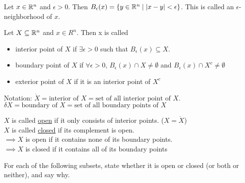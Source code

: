 

\begin{defn}
  Let $x\in \mathbb{R}^n$ and $\epsilon > 0$. Then $B_\epsilon (x) = \left\{ y\in \mathbb{R}^n \mid |x-y|<\epsilon \right\}$. This is called an $\epsilon$-neighborhood of $x$.
\end{defn}
\begin{defn}
  Let $X\subseteq \mathbb{R}^n$ and $x\in R^n$. Then x is called
  \begin{itemize}
    \item interior point of $X$ if $\exists \epsilon > 0$ such that $B_\epsilon (x) \subseteq X$.
    \item boundary point of $X$ if $\forall \epsilon > 0$, $B_\epsilon (x) \cap X \neq \emptyset$ and $B_\epsilon (x) \cap X^c \neq \emptyset$
    \item exterior point of $X$ if it is an interior point of $X^c$
  \end{itemize}
  Notation: $\mathring{X} = \text{interior of }X = \text{set of all interior point of }X$.
  $\delta X = \text{boundary of }X = \text{set of all boundary points of }X$
\end{defn}
\begin{defn}
  $X$ is called \ul{open} if it only consists of interior points. ($X=\mathring{X}$) \\
  $X$ is called \ul{closed} if its complement is open. \\
  $\implies X$ is open if it contains none of its boundary points. \\
  $\implies X$ is closed if it contains all of its boundary points \\
\end{defn}

For each of the following subsets, state whether it is open or closed (or both or neither), and say why.

